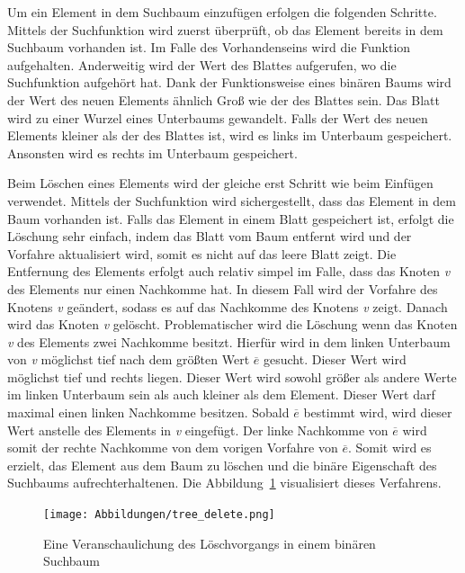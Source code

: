 Um ein Element in dem Suchbaum einzufügen erfolgen die folgenden Schritte. Mittels der Suchfunktion wird zuerst überprüft, ob das Element bereits in dem Suchbaum vorhanden ist. Im Falle des Vorhandenseins wird die Funktion aufgehalten. Anderweitig wird der Wert des Blattes aufgerufen, wo die Suchfunktion aufgehört hat. Dank der Funktionsweise eines binären Baums wird der Wert des neuen Elements ähnlich Groß wie der des Blattes sein. Das Blatt wird zu einer Wurzel eines Unterbaums gewandelt. Falls der Wert des neuen Elements kleiner als der des Blattes ist, wird es links im Unterbaum gespeichert. Ansonsten wird es rechts im Unterbaum gespeichert. \autocite[140]{knebl_algorithmen_2021}

Beim Löschen eines Elements wird der gleiche erst Schritt wie beim Einfügen verwendet. Mittels der Suchfunktion wird sichergestellt, dass das Element in dem Baum vorhanden ist. Falls das Element in einem Blatt gespeichert ist, erfolgt die Löschung sehr einfach, indem das Blatt vom Baum entfernt wird und der Vorfahre aktualisiert wird, somit es nicht auf das leere Blatt zeigt. Die Entfernung des Elements erfolgt auch relativ simpel im Falle, dass das Knoten \textit{v} des Elements nur einen Nachkomme hat. In diesem Fall wird der Vorfahre des Knotens \textit{v} geändert, sodass es auf das Nachkomme des Knotens \textit{v} zeigt. Danach wird das Knoten \textit{v} gelöscht. Problematischer wird die Löschung wenn das Knoten \textit{v} des Elements zwei Nachkomme besitzt. Hierfür wird in dem linken Unterbaum von \textit{v} möglichst tief nach dem größten Wert \textit{$\overline{e}$} gesucht. Dieser Wert wird möglichst tief und rechts liegen. Dieser Wert wird sowohl größer als andere Werte im linken Unterbaum sein als auch kleiner als dem Element. Dieser Wert darf maximal einen linken Nachkomme besitzen. Sobald \textit{$\overline{e}$} bestimmt wird, wird dieser Wert anstelle des Elements in \textit{v} eingefügt. Der linke Nachkomme von \textit{$\overline{e}$} wird somit der rechte Nachkomme von dem vorigen Vorfahre von \textit{$\overline{e}$}. Somit wird es erzielt, das Element aus dem Baum zu löschen und die binäre Eigenschaft des Suchbaums aufrechterhaltenen. Die Abbildung~\ref{fig: tree_delete} visualisiert dieses Verfahrens. \autocite[140-141]{knebl_algorithmen_2021}

\begin{figure}[!b]
	\texttt{[image: Abbildungen/tree\_delete.png]}
	\centering
	\caption{Eine Veranschaulichung des Löschvorgangs in einem binären Suchbaum \autocite[140]{knebl_algorithmen_2021}}
	\label{fig: tree_delete}
\end{figure}

